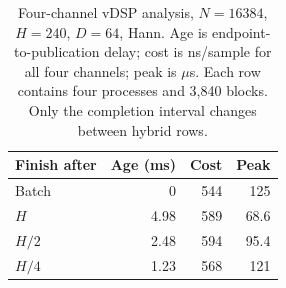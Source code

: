 \begin{table}[htbp]
\centering\small
\begin{tabular}{@{}lrrr@{}}
\toprule
Finish after & Age (ms) & Cost & Peak \\
\midrule
Batch & 0 & 544 & 125 \\
$H$ & 4.98 & 589 & 68.6 \\
$H/2$ & 2.48 & 594 & 95.4 \\
$H/4$ & 1.23 & 568 & 121 \\
\bottomrule
\end{tabular}
\caption{Four-channel vDSP analysis, $N=16384$, $H=240$, $D=64$, Hann. Age is endpoint-to-publication delay; cost is ns/sample for all four channels; peak is $\mu$s. Each row contains four processes and 3,840 blocks. Only the completion interval changes between hybrid rows.}
\label{tab:conference-horizons}
\end{table}
